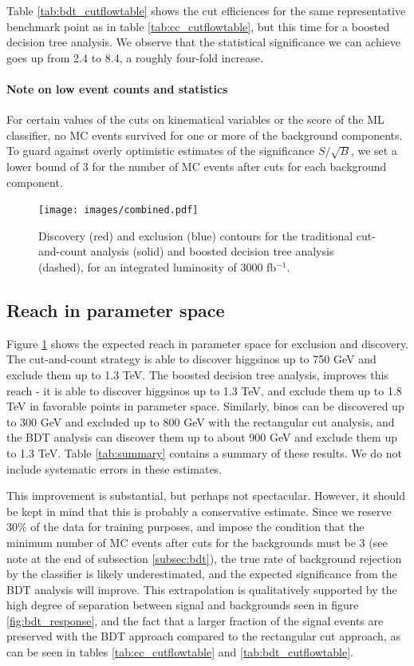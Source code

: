 Table \ref{tab:bdt_cutflowtable} shows the cut efficiences for the same representative benchmark point as in table \ref{tab:cc_cutflowtable}, but this time for a boosted decision tree analysis. We observe that the statistical significance we can achieve goes up from 2.4 to 8.4, a roughly four-fold increase.

\paragraph{Note on low event counts and statistics} For certain values of the cuts on kinematical variables or the score of the ML classifier, no MC events survived for one or more of the background components. To guard against overly optimistic estimates of the significance $S/\sqrt{B}$, we set a lower bound of 3 for the number of MC events after cuts for each background component.

\begin{figure}[h]
\centering
\texttt{[image: images/combined.pdf]}
\caption{Discovery (red) and exclusion (blue) contours for the traditional cut-and-count analysis (solid) and boosted decision tree analysis (dashed), for an integrated luminosity of 3000 fb$^{-1}$.   }
\label{fig:contours}
\end{figure}

\subsection{Reach in parameter space}

Figure \ref{fig:contours} shows the expected reach in parameter space for exclusion and discovery. The cut-and-count strategy is able to discover higgsinos up to 750 GeV  and exclude them up to 1.3 TeV. The boosted decision tree analysis, improves this reach - it is able to discover higgsinos up to 1.3 TeV, and exclude them up to 1.8 TeV in favorable points in parameter space. Similarly, binos can be discovered up to 300 GeV and excluded up to 800 GeV with the rectangular cut analysis, and the BDT analysis can discover them up to about 900 GeV and exclude them up to 1.3 TeV. Table \ref{tab:summary} contains a summary of these results. We do not include systematic errors in these estimates.  

This improvement is substantial, but perhaps not spectacular. However, it should be kept in mind that this is probably a conservative estimate. Since we reserve 30\% of the data for training purposes, and impose the condition that the minimum number of MC events after cuts for the backgrounds must be 3 (see note at the end of subsection \ref{subsec:bdt}), the true rate of background rejection by the classifier is likely underestimated, and the expected significance from the BDT analysis will improve. This extrapolation is qualitatively supported by the high degree of separation between signal and backgrounds seen in figure \ref{fig:bdt_response}, and the fact that a larger fraction of the signal events are preserved with the BDT approach compared to the rectangular cut approach, as can be seen in tables \ref{tab:cc_cutflowtable} and \ref{tab:bdt_cutflowtable}. 

